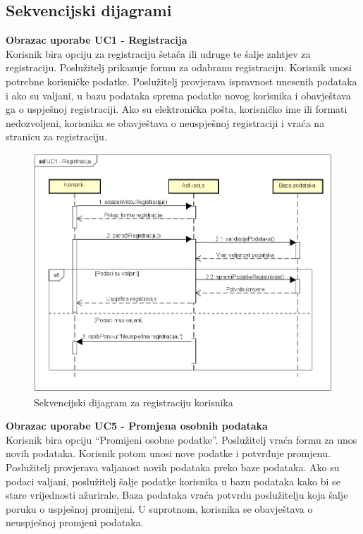 				\eject		
				
			\subsection{Sekvencijski dijagrami}
				
				\noindent \textbf{Obrazac uporabe UC1 - Registracija}\\
				Korisnik bira opciju za registraciju šetača ili udruge te šalje zahtjev za registraciju. Poslužitelj prikazuje formu za odabranu registraciju. Korisnik unosi potrebne korisničke podatke. Poslužitelj provjerava ispravnost unesenih podataka i ako su valjani, u bazu podataka sprema podatke novog korisnika i obavještava ga o uspješnoj registraciji. Ako su elektronička pošta, korisničko ime ili formati nedozvoljeni, korisnika se obavještava o neuspješnoj registraciji i vraća na stranicu za registraciju.
				
				\begin{figure}[H]
					\includegraphics[scale=0.7]{dijagrami/UC1-Registracija.PNG} 
					\centering
					\caption{Sekvencijski dijagram za registraciju korisnika}
					\label{fig:uc-1}
				\end{figure}
				
				\eject
				
				\noindent \textbf{Obrazac uporabe UC5 - Promjena osobnih podataka}\\
				Korisnik bira opciju “Promijeni osobne podatke”. Poslužitelj vraća formu za unos novih podataka. Korisnik potom unosi nove podatke i potvrđuje promjenu. Poslužitelj provjerava valjanost novih podataka preko baze podataka. Ako su podaci valjani, poslužitelj šalje podatke korisnika u bazu podataka kako bi se stare vrijednosti ažurirale. Baza podataka vraća potvrdu poslužitelju koja šalje poruku o uspješnoj promijeni. U suprotnom, korisnika se obavještava o neuspješnoj promjeni podataka.
				
